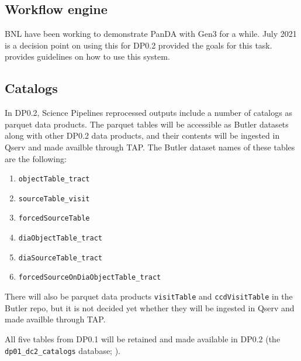 \subsection {Workflow engine}
BNL have been working to demonstrate PanDA with Gen3 for a while. July 2021 is a decision point on using this for DP0.2
 provided the goals for this task.  provides guidelines on how to use this system.


\subsection {Catalogs}
In DP0.2, Science Pipelines reprocessed outputs include a number of catalogs
as parquet data products.
The parquet tables will be accessible as Butler datasets along with other DP0.2 data products, and their contents will be ingested in Qserv and made availble through TAP.
The Butler dataset names of these tables are the following:
\begin{enumerate}
  \item \texttt{objectTable\_tract}
  \item \texttt{sourceTable\_visit}
  \item \texttt{forcedSourceTable}
  \item \texttt{diaObjectTable\_tract}
  \item \texttt{diaSourceTable\_tract}
  \item \texttt{forcedSourceOnDiaObjectTable\_tract}
\end{enumerate}

There will also be parquet data products \texttt{visitTable} and \texttt{ccdVisitTable} in the Butler repo, but it is not decided yet whether they will be ingested in Qserv and made availble through TAP.

All five tables from DP0.1 will be retained and made available in DP0.2
(the \texttt{dp01\_dc2\_catalogs} database; ).
